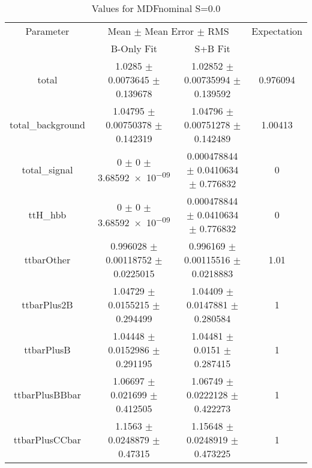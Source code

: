 \begin{table}
\centering
\caption{Values for MDFnominal S=0.0}
\begin{tabular}{cccc}
\toprule
Parameter & \multicolumn{2}{c}{Mean $\pm$ Mean Error $\pm$ RMS} & Expectation\\
 & B-Only Fit & S+B Fit & \\
\midrule
total & \num{1.0285} $\pm$ \num{0.0073645} $\pm$ \num{0.139678} & \num{1.02852} $\pm$ \num{0.00735994} $\pm$ \num{0.139592} & \num{0.976094}\\
total\_background & \num{1.04795} $\pm$ \num{0.00750378} $\pm$ \num{0.142319} & \num{1.04796} $\pm$ \num{0.00751278} $\pm$ \num{0.142489} & \num{1.00413}\\
total\_signal & \num{0} $\pm$ \num{0} $\pm$ \num{3.68592e-09} & \num{0.000478844} $\pm$ \num{0.0410634} $\pm$ \num{0.776832} & \num{0}\\
ttH\_hbb & \num{0} $\pm$ \num{0} $\pm$ \num{3.68592e-09} & \num{0.000478844} $\pm$ \num{0.0410634} $\pm$ \num{0.776832} & \num{0}\\
ttbarOther & \num{0.996028} $\pm$ \num{0.00118752} $\pm$ \num{0.0225015} & \num{0.996169} $\pm$ \num{0.00115516} $\pm$ \num{0.0218883} & \num{1.01}\\
ttbarPlus2B & \num{1.04729} $\pm$ \num{0.0155215} $\pm$ \num{0.294499} & \num{1.04409} $\pm$ \num{0.0147881} $\pm$ \num{0.280584} & \num{1}\\
ttbarPlusB & \num{1.04448} $\pm$ \num{0.0152986} $\pm$ \num{0.291195} & \num{1.04481} $\pm$ \num{0.0151} $\pm$ \num{0.287415} & \num{1}\\
ttbarPlusBBbar & \num{1.06697} $\pm$ \num{0.021699} $\pm$ \num{0.412505} & \num{1.06749} $\pm$ \num{0.0222128} $\pm$ \num{0.422273} & \num{1}\\
ttbarPlusCCbar & \num{1.1563} $\pm$ \num{0.0248879} $\pm$ \num{0.47315} & \num{1.15648} $\pm$ \num{0.0248919} $\pm$ \num{0.473225} & \num{1}\\
\bottomrule
\end{tabular}
\end{table}